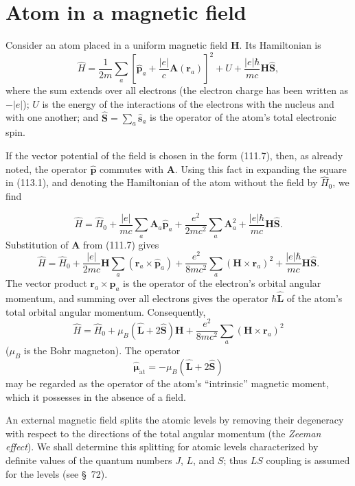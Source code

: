 \section{Atom in a magnetic field}

Consider an atom placed in a uniform magnetic field $\mathbf H$. Its Hamiltonian is
\begin{equation}
 \hat H=\frac1{2m}\sum_a\left[\hat{\mathbf p}_a+\frac{|e|}{c}\mathbf A(\mathbf r_a)\right]^2+U+\frac{|e|\hbar}{mc}\mathbf H\hat{\mathbf S},
 \tag{113.1}
\end{equation}
where the sum extends over all electrons (the electron charge has been written as $-|e|$); $U$ is the energy of the interactions of the electrons with the nucleus and with one another; and $\hat{\mathbf S}=\sum_a\hat{\mathbf s}_a$ is the operator of the atom's total electronic spin.

If the vector potential of the field is chosen in the form (111.7), then, as already noted, the operator $\hat{\mathbf p}$ commutes with $\mathbf A$. Using this fact in expanding the square in (113.1), and denoting the Hamiltonian of the atom without the field by $\hat H_0$, we find

\[
 \hat H=\hat H_0+\frac{|e|}{mc}\sum_a\mathbf A_a\hat{\mathbf p}_a+\frac{e^2}{2mc^2}\sum_a\mathbf A_a^2+\frac{|e|\hbar}{mc}\mathbf H\hat{\mathbf S}.
\]
Substitution of $\mathbf A$ from (111.7) gives
\[
 \hat H=\hat H_0+\frac{|e|}{2mc}\mathbf H\sum_a(\mathbf r_a\times\hat{\mathbf p}_a)+\frac{e^2}{8mc^2}\sum_a(\mathbf H\times\mathbf r_a)^2+\frac{|e|\hbar}{mc}\mathbf H\hat{\mathbf S}.
\]
The vector product $\mathbf r_a\times\hat{\mathbf p}_a$ is the operator of the electron's orbital angular momentum, and summing over all electrons gives the operator $\hbar\hat{\mathbf L}$ of the atom's total orbital angular momentum. Consequently,
\begin{equation}
 \hat H=\hat H_0+\mu_B(\hat{\mathbf L}+2\hat{\mathbf S})\mathbf H+\frac{e^2}{8mc^2}\sum_a(\mathbf H\times\mathbf r_a)^2
 \tag{113.2}
\end{equation}
($\mu_B$ is the Bohr magneton). The operator
\begin{equation}
 \hat{\boldsymbol\mu}_{\text{at}}=-\mu_B(\hat{\mathbf L}+2\hat{\mathbf S})
 \tag{113.3}
\end{equation}
may be regarded as the operator of the atom's ``intrinsic'' magnetic moment, which it possesses in the absence of a field.

An external magnetic field splits the atomic levels by removing their degeneracy with respect to the directions of the total angular momentum (the \emph{Zeeman effect}). We shall determine this splitting for atomic levels characterized by definite values of the quantum numbers $J$, $L$, and $S$; thus $LS$ coupling is assumed for the levels (see §~72).

